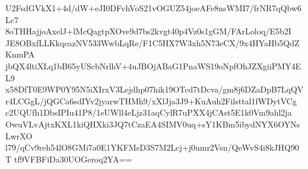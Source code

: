 U2FsdGVkX1+4d/dW+eJI0DFvhVoS21vOGUZ54joeAFe8nsWMI7/frNR7qQbw6Lc7
8oTHHajjoAxelJ+lMcQagtpXOve9d7bs2kvgt40p4Vz0s1gGM/FArLoloq/E5b2I
JE8OBxfLLKkqeazNV533WwbLqRe/F1C5HX7W3xh5N73eCX/9x4HYaHb5QdZKnmPA
jbQX4ltiXLq1bB65yUScbNrlhV+4uJBOjABaG1PnaWS19oNpfOhJZXgiiPMY4EL9
x58DfT0E9WP0Y95N5iXIrxV3Lejdhp07hik19OTcd7tDcva/gm8j6DZaDpB7LqQV
r4LCGgL/jQGCa6sdIYv2jyarwTHMh9/xXlJja3J9+KuAuh2Filsttal1fWDytVCg
c2UQUfh1DbsIPIu41P8/1eUWll4eLjz31aqCylR7uPXX4jCAst5E1k0Vm9ahl2ja
OwuVLvAjtxKXL1kiQHXki3JQ7tCzaEA4SIMV0uq+sY1KBm5ibydNYX6OYNsLwrXO
l79/qCv9reh54lO8GMi7a0E1YKFMsD3S7M2Lcj+j0umr2Vsn/QeWvS4i8kJHQ90T
tf9VFBFiDa30UOGeroq2YA==
